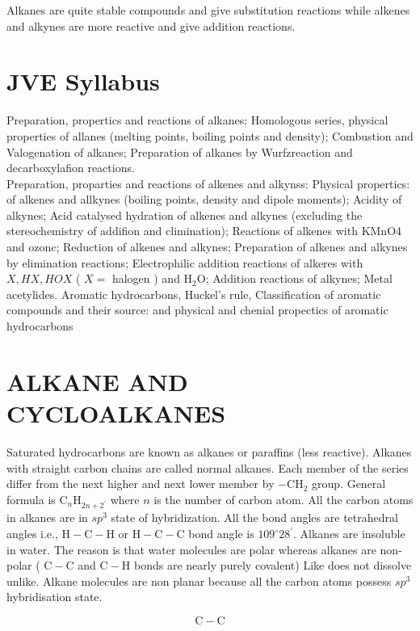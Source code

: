 \documentclass[10pt]{article}
\begin{document}
Alkanes are quite stable compounds and give substitution reactions while alkenes and alkynes are more reactive and give addition reactions.

\section*{JVE Syllabus}
Preparation, propertics and reactions of alkanes: Homologous series, physical properties of allanes (melting points, boiling points and density); Combustion and Valogenation of alkanes; Preparation of alkanes by Wurfzreaction and decarboxylafion reactions.\\
Preparation, proparties and reactions of alkenes and alkynss: Physical propertics: of alkenes and allkynes (boiling points, density and dipole moments); Acidity of alkynes; Acid catalysed hydration of alkenes and alkynes (excluding the stereochemistry of addifion and climination); Reactions of alkenes with KMnO4 and ozonc; Reduction of alkenes and alkynes; Preparation of alkenes and alkynes by elimination reactions; Electrophilic addition reactions of alkeres with $X, H X, H O X$ ( $X=$ halogen ) and $\mathrm{H}_{2} \mathrm{O}$; Addition reactions of alkynes; Metal acetylides. Aromatic hydrocarbons, Huckel's rule, Classification of aromatic compounds and their source: and physical and chenial propectics of aromatic hydrocarbons

\section*{ALKANE AND CYCLOALKANES}
Saturated hydrocarbons are known as alkanes or paraffins (less reactive). Alkanes with straight carbon chains are called normal alkanes. Each member of the series differ from the next higher and next lower member by $-\mathrm{CH}_{2}$ group. General formula is $\mathrm{C}_{n} \mathrm{H}_{2 n+2^{\prime}}$ where $n$ is the number of carbon atom. All the carbon atoms in alkanes are in $s p^{3}$ state of hybridization. All the bond angles are tetrahedral angles i.e., $\mathrm{H}-\mathrm{C}-\mathrm{H}$ or $\mathrm{H}-\mathrm{C}-\mathrm{C}$ bond angle is $109^{\circ} 28^{\prime}$. Alkanes are insoluble in water. The reason is that water molecules are polar whereas alkanes are non-polar ( $\mathrm{C}-\mathrm{C}$ and $\mathrm{C}-\mathrm{H}$ bonds are nearly purely covalent) Like does not dissolve unlike. Alkane molecules are non planar because all the carbon atoms possess $s p^{3}$ hybridisation state.

$$
\mathrm{C}-\mathrm{C}
$$
\end{document}
